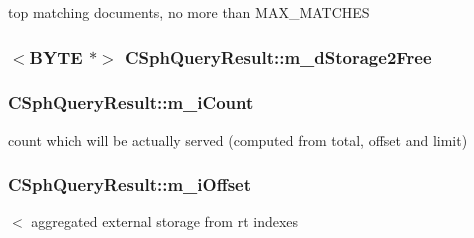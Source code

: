 top matching documents, no more than M\-A\-X\-\_\-\-M\-A\-T\-C\-H\-E\-S 

\hypertarget{classCSphQueryResult_aa314b61046cb6d31ef7f144e87672b7e}{
\subsubsection[{m\-\_\-d\-Storage2\-Free}]{$<${\bf B\-Y\-T\-E} $\ast$$>$ C\-Sph\-Query\-Result\-::m\-\_\-d\-Storage2\-Free}}\label{classCSphQueryResult_aa314b61046cb6d31ef7f144e87672b7e}
\hypertarget{classCSphQueryResult_aea3eb975d92e04c36abfea37beff0a65}{
\subsubsection[{m\-\_\-i\-Count}]{ C\-Sph\-Query\-Result\-::m\-\_\-i\-Count}}\label{classCSphQueryResult_aea3eb975d92e04c36abfea37beff0a65}


count which will be actually served (computed from total, offset and limit) 

\hypertarget{classCSphQueryResult_ae6d9b89727716e85238f0eb6fab19ab0}{
\subsubsection[{m\-\_\-i\-Offset}]{ C\-Sph\-Query\-Result\-::m\-\_\-i\-Offset}}\label{classCSphQueryResult_ae6d9b89727716e85238f0eb6fab19ab0}


$<$ aggregated external storage from rt indexes 

